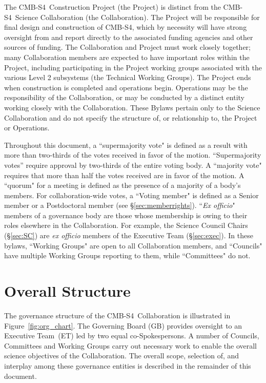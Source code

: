 \documentclass[12pt]{article}
\newcommand{\exec}{{Executive Team}}
\newcommand\collabname{CMB-S4}
\begin{document}
The \collabname\ Construction Project (the Project) is distinct from the \collabname\ Science Collaboration (the Collaboration). The Project will be responsible for final design and construction of \collabname, which by necessity will have strong oversight from and  report directly to the associated funding agencies and other sources of funding. The Collaboration and Project must work closely together; many Collaboration members are expected to have important roles within the Project, including participating in the Project working groups associated with the various Level 2 subsystems (the Technical Working Groups). The Project ends when construction is completed and operations begin. Operations may be the responsibility of the Collaboration, or may be conducted by a distinct entity working closely with the Collaboration. These Bylaws pertain only to the Science Collaboration and do not specify the structure of, or relationship to, the Project or Operations.

Throughout this document,  a ``supermajority vote" is defined as a result with more than two-thirds of the votes received in favor of  the motion. ``Supermajority votes'' require approval by two-thirds of the entire voting body. A ``majority vote" requires that more than half the votes received are in favor of the motion.   A ``quorum" for a meeting is defined as the presence of a majority of a body's members.   For collaboration-wide votes, a ``Voting member" is  defined as a Senior member or a Postdoctoral member (see \S\ref{sec:memberrights}). ``{\it Ex officio}" members of a governance body are those whose membership is owing to their roles elsewhere in the Collaboration.  For example, the Science Council Chairs (\S\ref{sec:SC}) are {\it ex officio} members of the Executive Team (\S\ref{sec:exec}).  In these bylaws,  ``Working Groups" are open to all Collaboration members, and ``Councils" have multiple Working Groups reporting to them, while ``Committees" do not.

\section{Overall Structure}

The governance structure of the \collabname\ Collaboration is illustrated in Figure~\ref{fig:org_chart}.  The Governing Board (GB) provides oversight to an \exec\ (ET) led by two equal co-Spokespersons.  A number of Councils, Committees and Working Groups carry out necessary work to enable the overall science objectives of the Collaboration. The overall scope, selection of, and interplay among these governance entities is described in the remainder of this document.
\end{document}
